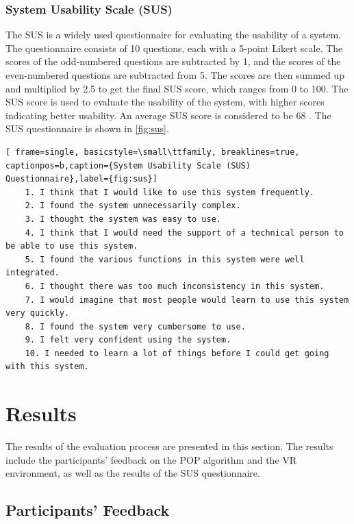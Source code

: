 \subsubsection{System Usability Scale (SUS)}
The \ac{SUS} is a widely used questionnaire for evaluating the usability of a system. The questionnaire consists of 10 questions, each with a 5-point Likert scale. The scores of the odd-numbered questions are subtracted by 1, and the scores of the even-numbered questions are subtracted from 5. The scores are then summed up and multiplied by 2.5 to get the final \ac{SUS} score, which ranges from 0 to 100. The \ac{SUS} score is used to evaluate the usability of the system, with higher scores indicating better usability. An average \ac{SUS} score is considered to be 68 \cite{SUSmeasure}. The \ac{SUS} questionnaire is shown in \autoref{fig:sus}.
\begin{lstlisting}[ frame=single, basicstyle=\small\ttfamily, breaklines=true, captionpos=b,caption={System Usability Scale (SUS) Questionnaire},label={fig:sus}]
    1. I think that I would like to use this system frequently.
    2. I found the system unnecessarily complex.
    3. I thought the system was easy to use.
    4. I think that I would need the support of a technical person to be able to use this system.
    5. I found the various functions in this system were well integrated.
    6. I thought there was too much inconsistency in this system.
    7. I would imagine that most people would learn to use this system very quickly.
    8. I found the system very cumbersome to use.
    9. I felt very confident using the system.
    10. I needed to learn a lot of things before I could get going with this system.    
\end{lstlisting}





\section{Results}

The results of the evaluation process are presented in this section. The results include the participants' feedback on the \ac{POP} algorithm and the \ac{VR} environment, as well as the results of the \ac{SUS} questionnaire.

\subsection{Participants' Feedback}

